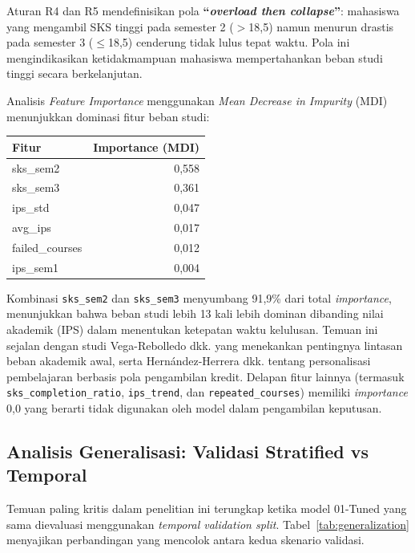 \documentclass{ieeeaccess}
\begin{document}
Aturan R4 dan R5 mendefinisikan pola \textbf{``\emph{overload then collapse}''}: mahasiswa yang mengambil SKS tinggi pada semester 2 ($>$18,5) namun menurun drastis pada semester 3 ($\le$18,5) cenderung tidak lulus tepat waktu. Pola ini mengindikasikan ketidakmampuan mahasiswa mempertahankan beban studi tinggi secara berkelanjutan.

Analisis \emph{Feature Importance} menggunakan \emph{Mean Decrease in Impurity} (MDI) menunjukkan dominasi fitur beban studi:

\begin{center}
\begin{tabular}{lr}
\hline
\textbf{Fitur} & \textbf{Importance (MDI)} \\
\hline
sks\_sem2 & 0,558 \\
sks\_sem3 & 0,361 \\
ips\_std  & 0,047 \\
avg\_ips  & 0,017 \\
failed\_courses & 0,012 \\
ips\_sem1 & 0,004 \\
\hline
\end{tabular}
\end{center}

Kombinasi \texttt{sks\_sem2} dan \texttt{sks\_sem3} menyumbang 91,9\% dari total \emph{importance}, menunjukkan bahwa beban studi lebih 13 kali lebih dominan dibanding nilai akademik (IPS) dalam menentukan ketepatan waktu kelulusan. Temuan ini sejalan dengan studi Vega-Rebolledo dkk. \cite{ref9} yang menekankan pentingnya lintasan beban akademik awal, serta Hern\'andez-Herrera dkk. \cite{ref20} tentang personalisasi pembelajaran berbasis pola pengambilan kredit. Delapan fitur lainnya (termasuk \texttt{sks\_completion\_ratio}, \texttt{ips\_trend}, dan \texttt{repeated\_courses}) memiliki \emph{importance} 0,0 yang berarti tidak digunakan oleh model dalam pengambilan keputusan.

\subsection{Analisis Generalisasi: Validasi Stratified vs Temporal}

Temuan paling kritis dalam penelitian ini terungkap ketika model 01-Tuned yang sama dievaluasi menggunakan \emph{temporal validation split}. Tabel~\ref{tab:generalization} menyajikan perbandingan yang mencolok antara kedua skenario validasi.
\end{document}
